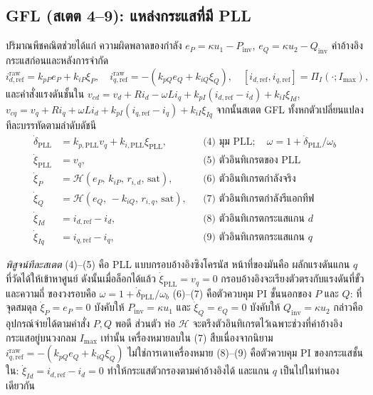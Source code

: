 \documentclass[12pt,a4paper]{article}
\begin{document}
\subsection{GFL (สเตต 4--9): แหล่งกระแสที่มี PLL}
ปริมาณพีชคณิตช่วยได้แก่ ความผิดพลาดของกำลัง
$e_P=\kappa u_1-P_{\mathrm{inv}}$, $e_Q=\kappa u_2-Q_{\mathrm{inv}}$
ค่าอ้างอิงกระแสก่อนและหลังการจำกัด
\begin{equation}
  i_{d,\mathrm{ref}}^{\mathrm{raw}}=k_{pP}e_P+k_{iP}\xi_P,\quad
  i_{q,\mathrm{ref}}^{\mathrm{raw}}=-(k_{pQ}e_Q+k_{iQ}\xi_Q),\quad
  [i_{d,\mathrm{ref}},i_{q,\mathrm{ref}}]=\Pi_I(\cdot;I_{\max}),
\end{equation}
และคำสั่งแรงดันชั้นใน
$v_{cd}=v_d+R i_d-\omega L i_q+k_{pI}(i_{d,\mathrm{ref}}-i_d)+k_{iI}\xi_{Id}$,
$v_{cq}=v_q+R i_q+\omega L i_d+k_{pI}(i_{q,\mathrm{ref}}-i_q)+k_{iI}\xi_{Iq}$
จากนั้นสเตต GFL ทั้งหกตัวเปลี่ยนแปลงทีละบรรทัดตามลำดับดัชนี
\begin{align}
  \dot{\delta}_{\mathrm{PLL}} &= k_{p,\mathrm{PLL}}v_q+k_{i,\mathrm{PLL}}\xi_{\mathrm{PLL}},
     &&\text{(4) มุม PLL};\quad \omega=1+\dot\delta_{\mathrm{PLL}}/\omega_b\\
  \dot{\xi}_{\mathrm{PLL}} &= v_q, &&\text{(5) ตัวอินทิเกรตของ PLL}\\
  \dot{\xi}_P &= \mathcal{H}(e_P,\,k_{iP},\,r_{i,d},\,\text{sat}),
     &&\text{(6) ตัวอินทิเกรตกำลังจริง}\\
  \dot{\xi}_Q &= \mathcal{H}(e_Q,\,-k_{iQ},\,r_{i,q},\,\text{sat}),
     &&\text{(7) ตัวอินทิเกรตกำลังรีแอกทีฟ}\\
  \dot{\xi}_{Id} &= i_{d,\mathrm{ref}}-i_d, &&\text{(8) ตัวอินทิเกรตกระแสแกน $d$}\\
  \dot{\xi}_{Iq} &= i_{q,\mathrm{ref}}-i_q, &&\text{(9) ตัวอินทิเกรตกระแสแกน $q$}
\end{align}

\emph{พิสูจน์ทีละสเตต} (4)--(5) คือ PLL แบบกรอบอ้างอิงซิงโครนัส หน้าที่ของมันคือ
ผลักแรงดันแกน $q$ ที่วัดได้ให้เข้าหาศูนย์ ดังนั้นเมื่อล็อกได้แล้ว
$\dot\xi_{\mathrm{PLL}}=v_q=0$ กรอบอ้างอิงจะเรียงตัวตรงกับแรงดันที่ขั้ว และความถี่
ของวงรอบคือ $\omega=1+\dot\delta_{\mathrm{PLL}}/\omega_b$ (6)--(7) คือตัวควบคุม PI
ชั้นนอกของ $P$ และ $Q$: ที่จุดสมดุล $\dot\xi_P=e_P=0$ บังคับให้
$P_{\mathrm{inv}}=\kappa u_1$ และ $\dot\xi_Q=e_Q=0$ บังคับให้
$Q_{\mathrm{inv}}=\kappa u_2$ กล่าวคืออุปกรณ์จ่ายได้ตามค่าสั่ง $P,Q$ พอดี ส่วนตัว
ห่อ $\mathcal H$ จะตรึงตัวอินทิเกรตไว้เฉพาะช่วงที่ค่าอ้างอิงกระแสอยู่บนวงกลม
$I_{\max}$ เท่านั้น เครื่องหมายลบใน (7) สืบเนื่องจากนิยาม
$i_{q,\mathrm{ref}}^{\mathrm{raw}}=-(k_{pQ}e_Q+k_{iQ}\xi_Q)$ ไม่ใช่การเดาเครื่องหมาย
(8)--(9) คือตัวควบคุม PI ของกระแสชั้นใน: $\dot\xi_{Id}=i_{d,\mathrm{ref}}-i_d=0$
ทำให้กระแสตัวกรองตามค่าอ้างอิงได้ และแกน $q$ เป็นไปในทำนองเดียวกัน
\end{document}
